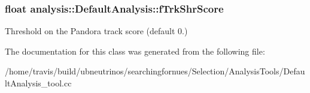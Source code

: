 \subsubsection[{\texorpdfstring{f\+Trk\+Shr\+Score}{fTrkShrScore}}]{\setlength{\rightskip}{0pt plus 5cm}float analysis\+::\+Default\+Analysis\+::f\+Trk\+Shr\+Score\hspace{0.3cm}{\ttfamily [private]}}\hypertarget{classanalysis_1_1DefaultAnalysis_aba718fab9e0072c6a046b9f9aa3670bf}{}\label{classanalysis_1_1DefaultAnalysis_aba718fab9e0072c6a046b9f9aa3670bf}
Threshold on the Pandora track score (default 0.) 

The documentation for this class was generated from the following file\+:\begin{DoxyCompactItemize}
\item 
/home/travis/build/ubneutrinos/searchingfornues/\+Selection/\+Analysis\+Tools/Default\+Analysis\+\_\+tool.\+cc\end{DoxyCompactItemize}
